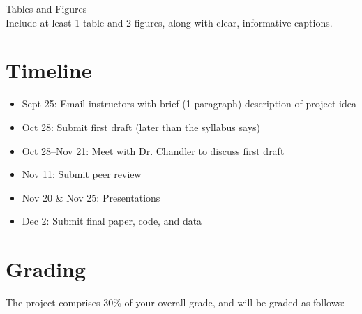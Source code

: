 \documentclass[12pt]{article}
\begin{document}
Tables and Figures \\
Include at least 1 table and 2 figures, along with
clear, informative captions. 


\section*{Timeline}

\begin{itemize}
  \item Sept 25: Email instructors with brief (1 paragraph) description
    of project idea
  \item Oct 28: Submit first draft (later than the syllabus says)
  \item Oct 28--Nov 21: Meet with Dr. Chandler to discuss first draft
  \item Nov 11: Submit peer review
  \item Nov 20 \& Nov 25: Presentations
  \item Dec 2: Submit final paper, code, and data
\end{itemize}


\section*{Grading}

The project comprises 30\% of your overall grade, and will be graded as follows:
\end{document}
